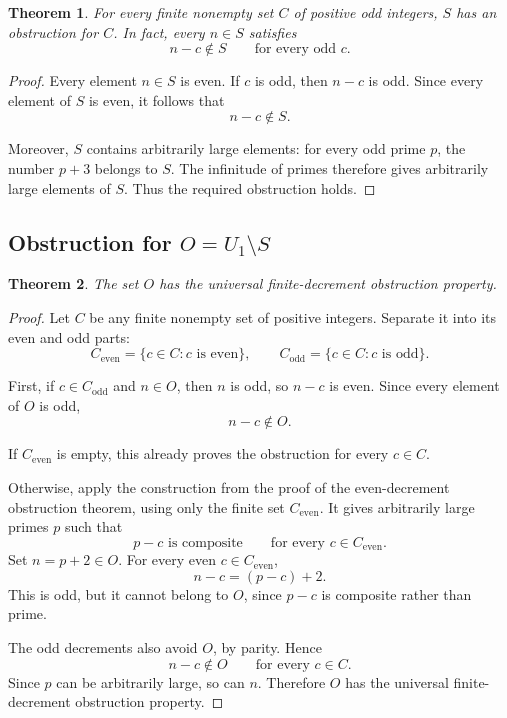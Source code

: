 \documentclass[11pt]{article}
\newtheorem{theorem}{Theorem}
\begin{document}
	
	
	\begin{theorem}
		For every finite nonempty set $C$ of positive odd integers,
		$S$ has an obstruction for $C$.
		In fact, every $n\in S$ satisfies
		\[
		n-c\notin S
		\qquad\text{for every odd }c.
		\]
	\end{theorem}
	
	\begin{proof}
		Every element $n\in S$ is even. If $c$ is odd, then $n-c$
		is odd. Since every element of $S$ is even, it follows that
		\[
		n-c\notin S.
		\]
		
		Moreover, $S$ contains arbitrarily large elements: for every
		odd prime $p$, the number $p+3$ belongs to $S$. The infinitude
		of primes therefore gives arbitrarily large elements of $S$.
		Thus the required obstruction holds.
	\end{proof}
	
	\subsection{Obstruction for $O=U_1\setminus S$}
	
	
	
	\begin{theorem}
		The set $O$ has the universal finite-decrement obstruction
		property.
	\end{theorem}
	
	\begin{proof}
		Let $C$ be any finite nonempty set of positive integers.
		Separate it into its even and odd parts:
		\[
		C_{\mathrm{even}}=\{c\in C:c\text{ is even}\},
		\qquad
		C_{\mathrm{odd}}=\{c\in C:c\text{ is odd}\}.
		\]
		
		First, if $c\in C_{\mathrm{odd}}$ and $n\in O$, then $n$ is
		odd, so $n-c$ is even. Since every element of $O$ is odd,
		\[
		n-c\notin O.
		\]
		
		If $C_{\mathrm{even}}$ is empty, this already proves the
		obstruction for every $c\in C$.
		
		Otherwise, apply the construction from the proof of the
		even-decrement obstruction theorem, using only the finite
		set $C_{\mathrm{even}}$. It gives arbitrarily large primes $p$
		such that
		\[
		p-c\text{ is composite}
		\qquad\text{for every }c\in C_{\mathrm{even}}.
		\]
		Set $n=p+2\in O$. For every even $c\in C_{\mathrm{even}}$,
		\[
		n-c=(p-c)+2.
		\]
		This is odd, but it cannot belong to $O$, since $p-c$ is
		composite rather than prime.
		
		The odd decrements also avoid $O$, by parity. Hence
		\[
		n-c\notin O
		\qquad\text{for every }c\in C.
		\]
		Since $p$ can be arbitrarily large, so can $n$. Therefore
		$O$ has the universal finite-decrement obstruction property.
	\end{proof}
	
\end{document}
